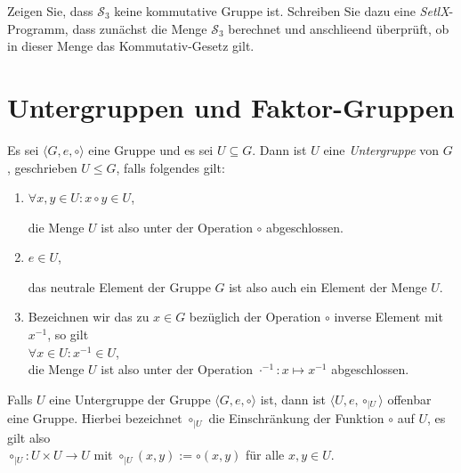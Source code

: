 \exercise
Zeigen Sie, dass $\mathcal{S}_3$ keine kommutative Gruppe ist.  Schreiben Sie dazu eine \textsl{SetlX}-Programm,
dass zun\"{a}chst die Menge $\mathcal{S}_3$ berechnet und anschlie\3end \"{u}berpr\"{u}ft, ob in dieser Menge das
Kommutativ-Gesetz gilt.
\exend

\section{Untergruppen und Faktor-Gruppen}
\begin{Definition}[Untergruppe]
  Es sei $\langle G, e, \circ \rangle$ eine Gruppe und es sei $U \subseteq G$.  Dann ist $U$ eine 
  \emph{Untergruppe} von $G$, geschrieben $U \leq G$, falls folgendes gilt:
  \begin{enumerate}
  \item $\forall x, y \in U: x \circ y \in U$,

        die Menge $U$ ist also unter der Operation $\circ$ abgeschlossen.
  \item $e \in U$,

        das neutrale Element der Gruppe $G$ ist also auch ein Element der Menge $U$.
  \item Bezeichnen wir das zu $x \in G$ bez\"{u}glich der Operation $\circ$ inverse Element mit $x^{-1}$, 
        so gilt
        \\[0.2cm]
        \hspace*{1.3cm}
        $\forall x \in U: x^{-1} \in U$,
        \\[0.2cm]
        die Menge $U$ ist also unter der Operation $\cdot^{-1}: x \mapsto x^{-1}$ abgeschlossen.
  \end{enumerate}
\eox
\end{Definition}

\remark
Falls $U$ eine Untergruppe der Gruppe $\langle G, e, \circ \rangle$ ist, dann ist 
$\langle U, e, \circ_{|U} \rangle$
offenbar eine Gruppe.  Hierbei bezeichnet $\circ_{|U}$ die Einschr\"{a}nkung der Funktion $\circ$ auf $U$, es
gilt also
\\[0.2cm]
\hspace*{1.3cm}
$\circ_{|U}: U \times U \rightarrow U$ \quad mit $\circ_{|U}(x,y) := \circ(x,y)$ f\"{u}r alle $x,y \in U$.
\eox


